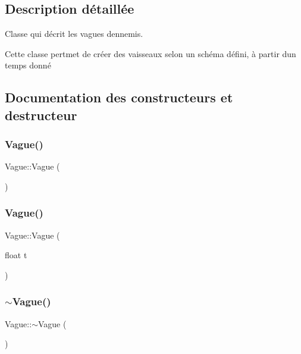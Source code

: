 \subsection{Description détaillée}
Classe qui décrit les vagues d\textquotesingle{}ennemis. 

Cette classe pertmet de créer des vaisseaux selon un schéma défini, à partir d\textquotesingle{}un temps donné 

\subsection{Documentation des constructeurs et destructeur}
\mbox{\label{class_vague_ab1e4786aa02ad641431b56658dbbaac3}} 
\subsubsection{\texorpdfstring{Vague()}{Vague()}\hspace{0.1cm}{\footnotesize\ttfamily [1/2]}}
{\footnotesize\ttfamily Vague\+::\+Vague (\begin{DoxyParamCaption}{ }\end{DoxyParamCaption})}

\mbox{\label{class_vague_a5a77009c7b36f68c5c5090c72294faa4}} 
\subsubsection{\texorpdfstring{Vague()}{Vague()}\hspace{0.1cm}{\footnotesize\ttfamily [2/2]}}
{\footnotesize\ttfamily Vague\+::\+Vague (\begin{DoxyParamCaption}\item[{float}]{t }\end{DoxyParamCaption})}

\mbox{\label{class_vague_a72eb74bd6b6cc6de266fa4b8f77e56d4}} 
\subsubsection{\texorpdfstring{$\sim$\+Vague()}{~Vague()}}
{\footnotesize\ttfamily Vague\+::$\sim$\+Vague (\begin{DoxyParamCaption}{ }\end{DoxyParamCaption})}



